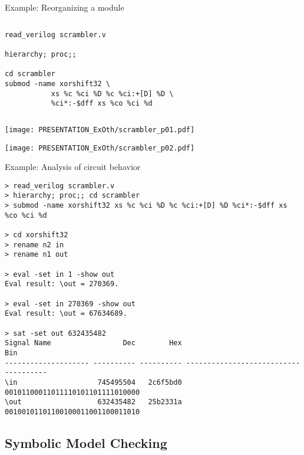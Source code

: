 \begin{frame}[t, fragile]{Example: Reorganizing a module}
\begin{columns}
\column[t]{4cm}

\column[t]{7cm}
\begin{lstlisting}[basicstyle=\ttfamily\fontsize{8pt}{10pt}\selectfont, language=ys, frame=single]
read_verilog scrambler.v

hierarchy; proc;;

cd scrambler
submod -name xorshift32 \
           xs %c %ci %D %c %ci:+[D] %D \
           %ci*:-$dff xs %co %ci %d
\end{lstlisting}
\end{columns}

\hfil\texttt{[image: PRESENTATION\_ExOth/scrambler\_p01.pdf]}

\hfil\texttt{[image: PRESENTATION\_ExOth/scrambler\_p02.pdf]}
\end{frame}

\begin{frame}[t, fragile]{Example: Analysis of circuit behavior}
\begin{lstlisting}[basicstyle=\ttfamily\fontsize{8pt}{10pt}\selectfont, language=ys]
> read_verilog scrambler.v
> hierarchy; proc;; cd scrambler
> submod -name xorshift32 xs %c %ci %D %c %ci:+[D] %D %ci*:-$dff xs %co %ci %d

> cd xorshift32
> rename n2 in
> rename n1 out

> eval -set in 1 -show out
Eval result: \out = 270369.

> eval -set in 270369 -show out
Eval result: \out = 67634689.

> sat -set out 632435482
Signal Name                 Dec        Hex                                   Bin
-------------------- ---------- ---------- -------------------------------------
\in                   745495504   2c6f5bd0      00101100011011110101101111010000
\out                  632435482   25b2331a      00100101101100100011001100011010
\end{lstlisting}
\end{frame}


\subsection{Symbolic Model Checking}


